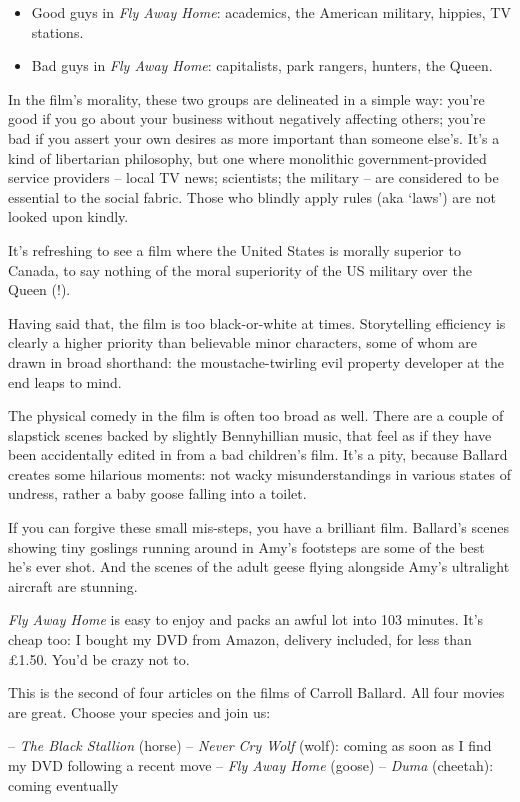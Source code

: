 \begin{itemize}
  \item Good guys in \textit{Fly Away Home}: academics, the American military, hippies, TV stations.
  \item Bad guys in \textit{Fly Away Home}: capitalists, park rangers, hunters, the Queen.
\end{itemize}

In the film's morality, these two groups are delineated in a simple way: you're good if you go about your business without negatively affecting others; you're bad if you assert your own desires as more important than someone else's. It's a kind of libertarian philosophy, but one where monolithic government-provided service providers -- local TV news; scientists; the military -- are considered to be essential to the social fabric. Those who blindly apply rules (aka `laws') are not looked upon kindly.

It's refreshing to see a film where the United States is morally superior to Canada, to say nothing of the moral superiority of the US military over the Queen (!).

Having said that, the film is too black-or-white at times. Storytelling efficiency is clearly a higher priority than believable minor characters, some of whom are drawn in broad shorthand: the moustache-twirling evil property developer at the end leaps to mind.

The physical comedy in the film is often too broad as well. There are a couple of slapstick scenes backed by slightly Bennyhillian music, that feel as if they have been accidentally edited in from a bad children's film. It's a pity, because Ballard creates some hilarious moments: not wacky misunderstandings in various states of undress, rather a baby goose falling into a toilet.

If you can forgive these small mis-steps, you have a brilliant film. Ballard's scenes showing tiny goslings running around in Amy's footsteps are some of the best he's ever shot. And the scenes of the adult geese flying alongside Amy's ultralight aircraft are stunning.

\textit{Fly Away Home} is easy to enjoy and packs an awful lot into 103 minutes. It's cheap too: I bought my DVD from Amazon, delivery included, for less than £1.50. You'd be crazy not to.

\secdiv

This is the second of four articles on the films of Carroll Ballard. All four movies are great. Choose your species and join us:

– \textit{The Black Stallion} (horse)
– \textit{Never Cry Wolf} (wolf): coming as soon as I find my DVD following a recent move
– \textit{Fly Away Home} (goose)
– \textit{Duma} (cheetah): coming eventually
